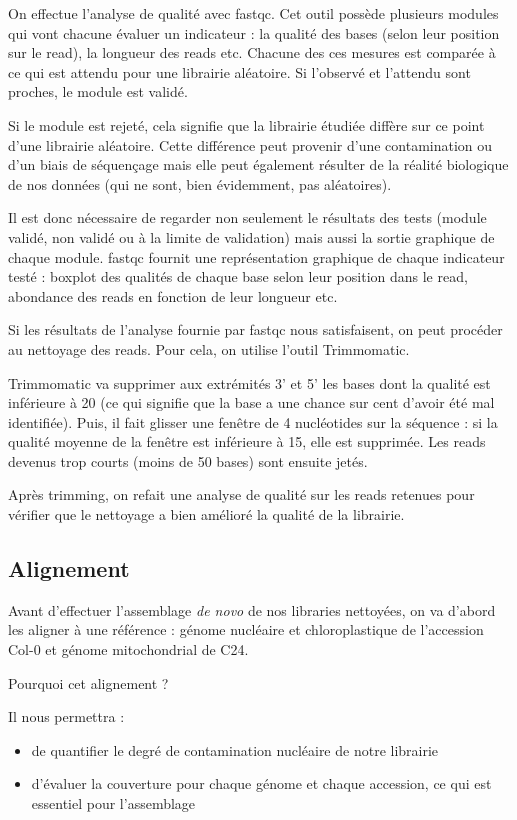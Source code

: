 \documentclass[a4paper]{article}
\begin{document}
On effectue l'analyse de qualité avec fastqc. Cet outil possède plusieurs modules qui vont chacune évaluer un indicateur : la qualité des bases (selon leur position sur le read), la longueur des reads etc. Chacune des ces mesures est comparée à ce qui est attendu pour une librairie aléatoire. Si l'observé et l'attendu sont proches, le module est validé.

Si le module est rejeté, cela signifie que la librairie étudiée diffère sur ce point d'une librairie aléatoire. Cette différence peut provenir d'une contamination ou d'un biais de séquençage mais elle peut également résulter de la réalité biologique de nos données (qui ne sont, bien évidemment, pas aléatoires).

Il est donc nécessaire de regarder non seulement le résultats des tests (module validé, non validé ou à la limite de validation) mais aussi la sortie graphique de chaque module. fastqc fournit une représentation graphique de chaque indicateur testé : boxplot des qualités de chaque base selon leur position dans le read, abondance des reads en fonction de leur longueur etc. 

Si les résultats de l'analyse fournie par fastqc nous satisfaisent, on peut procéder au nettoyage des reads. Pour cela, on utilise l'outil Trimmomatic.

Trimmomatic va supprimer aux extrémités 3' et 5' les bases dont la qualité est inférieure à 20 (ce qui signifie que la base a une chance sur cent d'avoir été mal identifiée). Puis, il fait glisser une fenêtre de 4 nucléotides sur la séquence : si la qualité moyenne de la fenêtre est inférieure à 15, elle est supprimée. Les reads devenus trop courts (moins de 50 bases) sont ensuite jetés.

Après trimming, on refait une analyse de qualité sur les reads retenues pour vérifier que le nettoyage a bien amélioré la qualité de la librairie.

\subsection{Alignement}

Avant d'effectuer l'assemblage \textit{de novo} de nos libraries nettoyées, on va d'abord les aligner à une référence : génome nucléaire et chloroplastique de l'accession Col-0 et génome mitochondrial de C24. 

Pourquoi cet alignement ? 

Il nous permettra : 
\begin{itemize}
\item de quantifier le degré de contamination nucléaire de notre librairie

\item d'évaluer la couverture pour chaque génome et chaque accession, ce qui est essentiel pour l'assemblage

\end{itemize}
\end{document}
